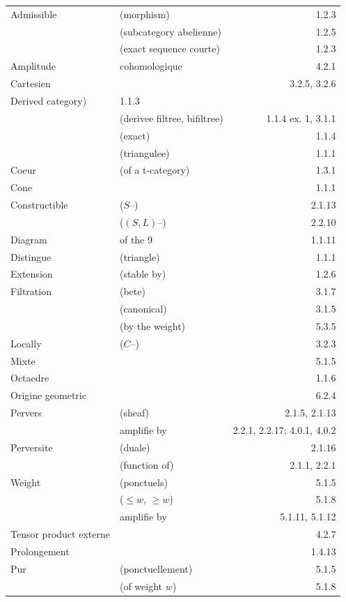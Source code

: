 \documentclass[12pt,a4paper]{article}
\theoremstyle{plain}
\theoremstyle{definition}
\theoremstyle{remark}
\begin{document}
\begin{tabular}{lp{8cm}r}
Admissible & (morphism) & 1.2.3 \\
& (subcategory abelienne) & 1.2.5 \\
& (exact sequence courte) & 1.2.3 \\[4pt]
Amplitude & cohomologique & 4.2.1 \\[4pt]
Cartesien & & 3.2.5, 3.2.6 \\[4pt]
Derived category) & 1.1.3 \\
& (derivee filtree, bifiltree) & 1.1.4 ex. 1, 3.1.1 \\
& (exact) & 1.1.4 \\
& (triangulee) & 1.1.1 \\[4pt]
Coeur & (of a t-category) & 1.3.1 \\
Cone & & 1.1.1 \\[4pt]
Constructible & ($S$--) & 2.1.13 \\
& ($(S, L)$--) & 2.2.10 \\[4pt]
Diagram & of the 9 & 1.1.11 \\
Distingue & (triangle) & 1.1.1 \\[4pt]
Extension & (stable by) & 1.2.6 \\[4pt]
Filtration & (bete) & 3.1.7 \\
& (canonical) & 3.1.5 \\
& (by the weight) & 5.3.5 \\[4pt]
Locally & ($C$--) & 3.2.3 \\[4pt]
Mixte & & 5.1.5 \\[4pt]
Octaedre & & 1.1.6 \\
Origine geometric & & 6.2.4 \\[4pt]
Pervers & (sheaf) & 2.1.5, 2.1.13 \\
& \quad amplifie by & 2.2.1, 2.2.17; 4.0.1, 4.0.2 \\[4pt]
Perversite & (duale) & 2.1.16 \\
& (function of) & 2.1.1, 2.2.1 \\[4pt]
Weight & (ponctuels) & 5.1.5 \\
& ($\leq w$, $\geq w$) & 5.1.8 \\
& \quad amplifie by & 5.1.11, 5.1.12 \\[4pt]
Tensor product externe & & 4.2.7 \\[4pt]
Prolongement & & 1.4.13 \\[4pt]
Pur & (ponctuellement) & 5.1.5 \\
& (of weight $w$) & 5.1.8 \\[4pt]

\end{tabular}
\end{document}

